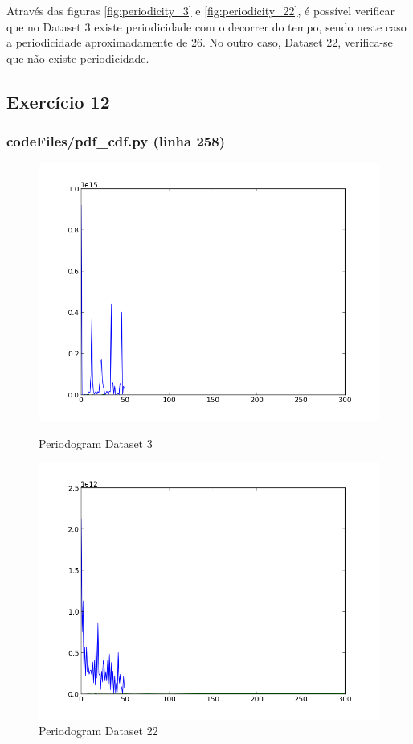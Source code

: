 \documentclass[pdftex,12pt,a4paper]{report}
\begin{document}
Através das figuras \ref{fig:periodicity_3} e \ref{fig:periodicity_22}, é possível verificar que no Dataset 3 existe periodicidade com o decorrer do tempo, sendo neste caso a periodicidade aproximadamente de 26. No outro caso, Dataset 22, verifica-se que não existe periodicidade.

\subsection{Exercício 12}
\subsubsection{codeFiles/pdf\_cdf.py (linha 258)}

\begin{figure}[!htb]
  \centering
  \begin{minipage}[b]{0.4\textwidth}
    \includegraphics[width=\textwidth]{periodogram/periodogram3.png}
    \caption{Periodogram Dataset 3}
    \label{fig:periodogram_3}
  \end{minipage}
  \hfill
  \begin{minipage}[b]{0.4\textwidth}
    \includegraphics[width=\textwidth]{periodogram/periodogram27.png}
    \caption{Periodogram Dataset 22}
    \label{fig:periodogram_27}
  \end{minipage}
\end{figure}
\end{document}
